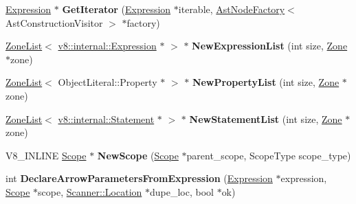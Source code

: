 \begin{DoxyCompactItemize}
\item 
\hypertarget{classv8_1_1internal_1_1_parser_traits_ac3bec3390010ebbf57507e037cee4595}{}\hyperlink{classv8_1_1internal_1_1_expression}{Expression} $\ast$ {\bfseries Get\+Iterator} (\hyperlink{classv8_1_1internal_1_1_expression}{Expression} $\ast$iterable, \hyperlink{classv8_1_1internal_1_1_ast_node_factory}{Ast\+Node\+Factory}$<$ Ast\+Construction\+Visitor $>$ $\ast$factory)\label{classv8_1_1internal_1_1_parser_traits_ac3bec3390010ebbf57507e037cee4595}

\item 
\hypertarget{classv8_1_1internal_1_1_parser_traits_aca555b86940ad02d2f75e8add6422b98}{}\hyperlink{classv8_1_1internal_1_1_zone_list}{Zone\+List}$<$ \hyperlink{classv8_1_1internal_1_1_expression}{v8\+::internal\+::\+Expression} $\ast$ $>$ $\ast$ {\bfseries New\+Expression\+List} (int size, \hyperlink{classv8_1_1internal_1_1_zone}{Zone} $\ast$zone)\label{classv8_1_1internal_1_1_parser_traits_aca555b86940ad02d2f75e8add6422b98}

\item 
\hypertarget{classv8_1_1internal_1_1_parser_traits_a2ca8071c6a740b06803ddefb38eb0f96}{}\hyperlink{classv8_1_1internal_1_1_zone_list}{Zone\+List}$<$ Object\+Literal\+::\+Property $\ast$ $>$ $\ast$ {\bfseries New\+Property\+List} (int size, \hyperlink{classv8_1_1internal_1_1_zone}{Zone} $\ast$zone)\label{classv8_1_1internal_1_1_parser_traits_a2ca8071c6a740b06803ddefb38eb0f96}

\item 
\hypertarget{classv8_1_1internal_1_1_parser_traits_aa6ec83169ac86f12d0823b9a3330397d}{}\hyperlink{classv8_1_1internal_1_1_zone_list}{Zone\+List}$<$ \hyperlink{classv8_1_1internal_1_1_statement}{v8\+::internal\+::\+Statement} $\ast$ $>$ $\ast$ {\bfseries New\+Statement\+List} (int size, \hyperlink{classv8_1_1internal_1_1_zone}{Zone} $\ast$zone)\label{classv8_1_1internal_1_1_parser_traits_aa6ec83169ac86f12d0823b9a3330397d}

\item 
\hypertarget{classv8_1_1internal_1_1_parser_traits_a1460a1fdac661c9f383484e359b705b1}{}V8\+\_\+\+I\+N\+L\+I\+N\+E \hyperlink{classv8_1_1internal_1_1_scope}{Scope} $\ast$ {\bfseries New\+Scope} (\hyperlink{classv8_1_1internal_1_1_scope}{Scope} $\ast$parent\+\_\+scope, Scope\+Type scope\+\_\+type)\label{classv8_1_1internal_1_1_parser_traits_a1460a1fdac661c9f383484e359b705b1}

\item 
\hypertarget{classv8_1_1internal_1_1_parser_traits_a66f50405d33129db942b4e5de6b982ce}{}int {\bfseries Declare\+Arrow\+Parameters\+From\+Expression} (\hyperlink{classv8_1_1internal_1_1_expression}{Expression} $\ast$expression, \hyperlink{classv8_1_1internal_1_1_scope}{Scope} $\ast$scope, \hyperlink{structv8_1_1internal_1_1_scanner_1_1_location}{Scanner\+::\+Location} $\ast$dupe\+\_\+loc, bool $\ast$ok)\label{classv8_1_1internal_1_1_parser_traits_a66f50405d33129db942b4e5de6b982ce}


\end{DoxyCompactItemize}
